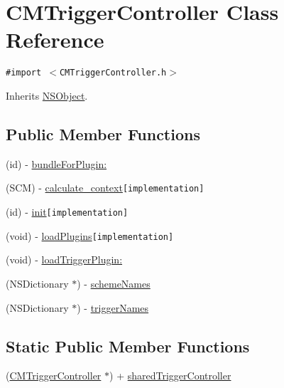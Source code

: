 \hypertarget{interface_c_m_trigger_controller}{
\section{CMTriggerController Class Reference}
\label{interface_c_m_trigger_controller}
}
{\tt \#import $<$CMTriggerController.h$>$}

Inherits \hyperlink{class_n_s_object}{NSObject}.

\subsection*{Public Member Functions}
\begin{CompactItemize}
\item 
(id) - \hyperlink{interface_c_m_trigger_controller_9e301be537e86bba778a0652bf38134d}{bundleForPlugin:}
\item 
(SCM) - \hyperlink{interface_c_m_trigger_controller_d87aa3e94baf65a3ca6f685f91a22929}{calculate\_\-context}{\tt  \mbox{[}implementation\mbox{]}}
\item 
(id) - \hyperlink{interface_c_m_trigger_controller_c6f39b489d64555699fa9c38e0516581}{init}{\tt  \mbox{[}implementation\mbox{]}}
\item 
(void) - \hyperlink{interface_c_m_trigger_controller_5eccedcfd0088a32f7cee0669ca9b772}{loadPlugins}{\tt  \mbox{[}implementation\mbox{]}}
\item 
(void) - \hyperlink{interface_c_m_trigger_controller_d4d5679bbd0b8a5b0a269b7f7f83ed79}{loadTriggerPlugin:}
\item 
(NSDictionary $\ast$) - \hyperlink{interface_c_m_trigger_controller_59d0e0659afe972e2e76fed5f2d4898b}{schemeNames}
\item 
(NSDictionary $\ast$) - \hyperlink{interface_c_m_trigger_controller_20dfaa03a6d6e2bb16c8774b1438127a}{triggerNames}
\end{CompactItemize}
\subsection*{Static Public Member Functions}
\begin{CompactItemize}
\item 
(\hyperlink{interface_c_m_trigger_controller}{CMTriggerController} $\ast$) + \hyperlink{interface_c_m_trigger_controller_a298bd150975d7ff5301a04bec3017ec}{sharedTriggerController}
\end{CompactItemize}
